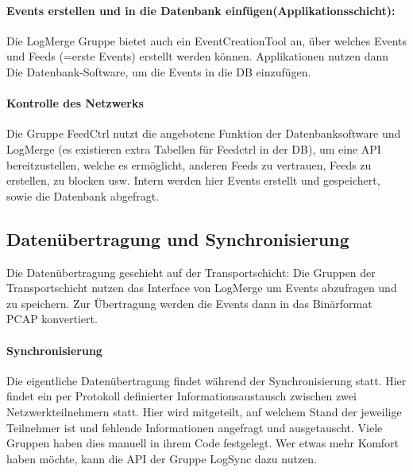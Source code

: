 \documentclass[a4paper, fontsize=9pt, oneside, headsepline=.5pt,footsepline=.5pt]{scrartcl}
\begin{document}
\paragraph{Events erstellen und in die Datenbank einfügen(Applikationsschicht):}
Die LogMerge Gruppe bietet auch ein EventCreationTool an, über welches Events und Feeds (=erste Events) erstellt werden können. Applikationen nutzen dann Die Datenbank-Software, um die Events in die DB einzufügen.

\paragraph{Kontrolle des Netzwerks}
Die Gruppe FeedCtrl nutzt die angebotene Funktion der Datenbanksoftware und LogMerge (es existieren extra Tabellen für Feedctrl in der DB), um eine API bereitzustellen, welche es ermöglicht, anderen Feeds zu vertrauen, Feeds zu erstellen, zu blocken usw. Intern werden hier Events erstellt und gespeichert, sowie die Datenbank abgefragt.

\subsection{Datenübertragung und Synchronisierung}
Die Datenübertragung geschieht auf der Transportschicht: Die Gruppen der Transportschicht nutzen das Interface von LogMerge um Events abzufragen und zu speichern. Zur Übertragung werden die Events dann in das Binärformat PCAP konvertiert.

\paragraph{Synchronisierung}
Die eigentliche Datenübertragung findet während der Synchronisierung statt. Hier findet ein per Protokoll definierter Informationsaustausch zwischen zwei Netzwerkteilnehmern statt. Hier wird mitgeteilt, auf welchem Stand der jeweilige Teilnehmer ist und fehlende Informationen angefragt und ausgetauscht.
Viele Gruppen haben dies manuell in ihrem Code festgelegt. Wer etwas mehr Komfort haben möchte, kann die API der Gruppe LogSync dazu nutzen.
\end{document}
